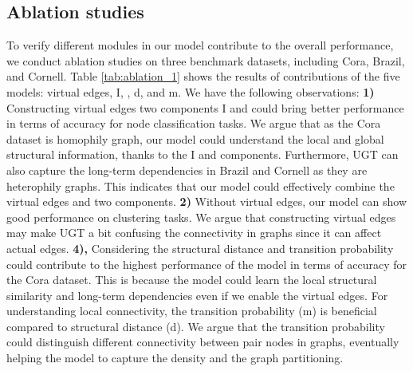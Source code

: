 \documentclass[oneside]{article}
\begin{document}
\subsection{Ablation studies}

To verify different modules in our model contribute to the overall performance, we conduct ablation studies on three benchmark datasets, including Cora, Brazil, and Cornell.
Table \ref{tab:ablation_1} shows the results of contributions of the five models: virtual edges, I, , d, and m.
We have the following observations:
\textbf{1) } Constructing virtual edges two components I and  could bring better performance in terms of accuracy for node classification tasks. 
We argue that as the Cora dataset is homophily graph, our model could understand the local and global structural information, thanks to the I and  components.
Furthermore, UGT can also capture the long-term dependencies in Brazil and Cornell as they are heterophily graphs.
This indicates that our model could effectively combine the virtual edges and two components.
\textbf{2) } Without virtual edges, our model can show good performance on clustering tasks.
We argue that constructing virtual edges may make UGT a bit confusing the connectivity in graphs since it can affect actual edges.
\textbf{4),} 
Considering the structural distance and transition probability could contribute to the highest performance of the model in terms of accuracy for the Cora dataset.
This is because the model could learn the local structural similarity and long-term dependencies even if we enable the virtual edges.
For understanding local connectivity, the transition probability (m) is beneficial compared to structural distance (d).
We argue that the transition probability could distinguish different connectivity between pair nodes in graphs, eventually helping the model to capture the density and the graph partitioning.
\end{document}
